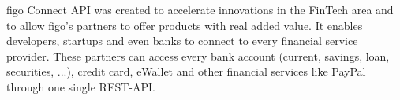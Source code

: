 figo Connect API was created to accelerate innovations in the FinTech area and to allow figo's partners to offer products with real added value\cite{figoFAQWhat}. It enables developers, startups and even banks to connect to every financial service provider. These partners can access every bank account (current, savings, loan, securities, ...), credit card, eWallet and other financial services like PayPal through one single REST-API. \cite{figoFAQWhat}\cite{figoFAQVision}\cite{figoFAQPartners}





